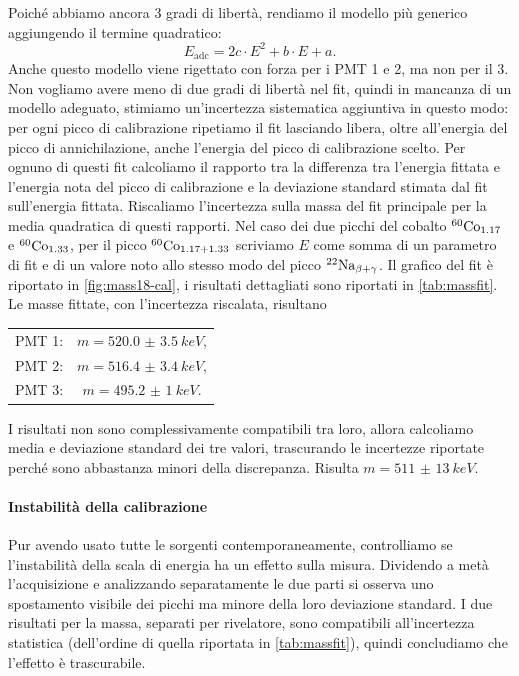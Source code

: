 Poiché abbiamo ancora 3 gradi di libertà,
rendiamo il modello più generico aggiungendo il termine quadratico:
\begin{equation}
	\label{eq:parabola}
	E_\text{adc} = 2c \cdot E^2 + b \cdot E + a.
\end{equation}
Anche questo modello viene rigettato con forza per i PMT 1 e 2, ma non per il 3.
Non vogliamo avere meno di due gradi di libertà nel fit,
quindi in mancanza di un modello adeguato, stimiamo un'incertezza sistematica aggiuntiva in questo modo:
per ogni picco di calibrazione ripetiamo il fit lasciando libera,
oltre all'energia del picco di annichilazione,
anche l'energia del picco di calibrazione scelto.
Per ognuno di questi fit calcoliamo il rapporto tra
la differenza tra l'energia fittata e l'energia nota del picco di calibrazione
e la deviazione standard stimata dal fit sull'energia fittata.
Riscaliamo l'incertezza sulla massa del fit principale
per la media quadratica di questi rapporti.
Nel caso dei due picchi del cobalto $^{\text{60}}\text{Co}_{1.17}$ e $^{\text{60}}\text{Co}_{1.33}$,
per il picco $^{\text{60}}\text{Co}_{1.17+1.33}$ scriviamo $E$ come somma di un parametro di fit e di un valore noto
allo stesso modo del picco $^{\text{22}}\text{Na}_{\beta+\gamma}$.
Il grafico del fit è riportato in \autoref{fig:mass18-cal},
i risultati dettagliati sono riportati in \autoref{tab:massfit}.
Le masse fittate, con l'incertezza riscalata, risultano
\begin{center}
	\begin{tabular}{cc}
		PMT 1: & $m=\SI{520.0(35)}{keV}$, \\
		PMT 2: & $m=\SI{516.4(34)}{keV}$, \\
		PMT 3: & $m=\SI{495.2(10)}{keV}$.
	\end{tabular}
\end{center}
I risultati non sono complessivamente compatibili tra loro,
allora calcoliamo media e deviazione standard dei tre valori,
trascurando le incertezze riportate perché sono abbastanza minori della discrepanza.
Risulta $m=\SI{511(13)}{keV}$.

\paragraph{Instabilità della calibrazione}

Pur avendo usato tutte le sorgenti contemporaneamente,
controlliamo se l'instabilità della scala di energia ha un effetto sulla misura.
Dividendo a metà l'acquisizione e analizzando separatamente le due parti
si osserva uno spostamento visibile dei picchi ma minore della loro deviazione standard.
I due risultati per la massa, separati per rivelatore,
sono compatibili all'incertezza statistica
(dell'ordine di quella riportata in \autoref{tab:massfit}),
quindi concludiamo che l'effetto è trascurabile.
